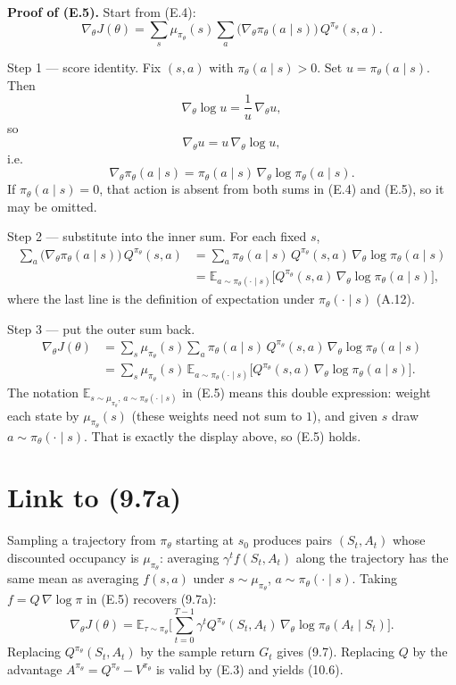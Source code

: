 \textbf{Proof of (E.5).} Start from (E.4): \[
\nabla_\theta J(\theta)
=
\sum_s\mu_{\pi_\theta}(s)
\sum_a
\bigl(\nabla_\theta\pi_\theta(a\mid s)\bigr)\,
Q^{\pi_\theta}(s,a).
\]

Step 1 --- score identity. Fix $(s,a)$ with $\pi_\theta(a\mid s)>0$. Set $u=\pi_\theta(a\mid s)$. Then \[
\nabla_\theta\log u
=
\frac{1}{u}\,\nabla_\theta u,
\] so \[
\nabla_\theta u
=
u\,\nabla_\theta\log u,
\] i.e. \[
\nabla_\theta\pi_\theta(a\mid s)
=
\pi_\theta(a\mid s)\,\nabla_\theta\log\pi_\theta(a\mid s).
\] If $\pi_\theta(a\mid s)=0$, that action is absent from both sums in (E.4) and (E.5), so it may be omitted.

Step 2 --- substitute into the inner sum. For each fixed $s$, \[
\begin{aligned}
\sum_a\bigl(\nabla_\theta\pi_\theta(a\mid s)\bigr)\,Q^{\pi_\theta}(s,a)
&=
\sum_a
\pi_\theta(a\mid s)\,
Q^{\pi_\theta}(s,a)\,
\nabla_\theta\log\pi_\theta(a\mid s)
\\
&=
\mathbb{E}_{a\sim\pi_\theta(\cdot\mid s)}
\bigl[
Q^{\pi_\theta}(s,a)\,
\nabla_\theta\log\pi_\theta(a\mid s)
\bigr],
\end{aligned}
\] where the last line is the definition of expectation under $\pi_\theta(\cdot\mid s)$ (A.12).

Step 3 --- put the outer sum back. \[
\begin{aligned}
\nabla_\theta J(\theta)
&=
\sum_s\mu_{\pi_\theta}(s)
\sum_a
\pi_\theta(a\mid s)\,
Q^{\pi_\theta}(s,a)\,
\nabla_\theta\log\pi_\theta(a\mid s)
\\
&=
\sum_s\mu_{\pi_\theta}(s)\,
\mathbb{E}_{a\sim\pi_\theta(\cdot\mid s)}
\bigl[
Q^{\pi_\theta}(s,a)\,
\nabla_\theta\log\pi_\theta(a\mid s)
\bigr].
\end{aligned}
\] The notation $\mathbb{E}_{s\sim\mu_{\pi_\theta},\,a\sim\pi_\theta(\cdot\mid s)}$ in (E.5) means this double expression: weight each state by $\mu_{\pi_\theta}(s)$ (these weights need not sum to $1$), and given $s$ draw $a\sim\pi_\theta(\cdot\mid s)$. That is exactly the display above, so (E.5) holds.

\section{Link to (9.7a)}

Sampling a trajectory from $\pi_\theta$ starting at $s_0$ produces pairs $(S_t,A_t)$ whose discounted occupancy is $\mu_{\pi_\theta}$: averaging $\gamma^t f(S_t,A_t)$ along the trajectory has the same mean as averaging $f(s,a)$ under $s\sim\mu_{\pi_\theta}$, $a\sim\pi_\theta(\cdot\mid s)$. Taking $f=Q\,\nabla\log\pi$ in (E.5) recovers (9.7a): \[
\nabla_\theta J(\theta)
=
\mathbb{E}_{\tau\sim\pi_\theta}\Biggl[
\sum_{t=0}^{T-1}
\gamma^{t}Q^{\pi_\theta}(S_t,A_t)\,\nabla_\theta\log\pi_\theta(A_t\mid S_t)
\Biggr].
\] Replacing $Q^{\pi_\theta}(S_t,A_t)$ by the sample return $G_t$ gives (9.7). Replacing $Q$ by the advantage $A^{\pi_\theta}=Q^{\pi_\theta}-V^{\pi_\theta}$ is valid by (E.3) and yields (10.6).

